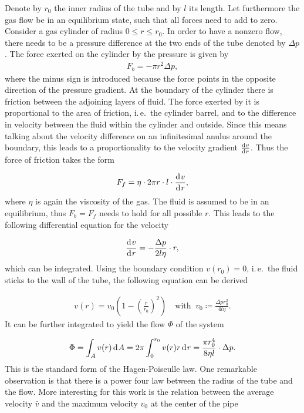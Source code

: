Denote by $r_0$ the inner radius of the tube and by $l$ its
length. Let furthermore the gas flow be in an equilibrium state, such
that all forces need to add to zero. Consider a gas cylinder of radius
$0 \leq r \leq r_0$. In order to have a nonzero flow, there needs to be a
pressure difference at the two ends of the tube denoted by $\Delta
p$. The force exerted on the cylinder by the pressure is given by
\begin{align*}
  F_b = - \pi r^2 \Delta p,
\end{align*}
where the minus sign is introduced because the force points in the
opposite direction of the pressure gradient. At the boundary of the
cylinder there is friction between the adjoining layers of fluid. The
force exerted by it is proportional to the area of friction, i.\,e.\
the cylinder barrel, and to the difference in velocity between the
fluid within the cylinder and outside. Since this means talking about
the velocity difference on an infinitesimal anulus around the
boundary, this leads to a proportionality to the velocity gradient
$\frac{\d[v]}{\d[r]}$. Thus the force of friction takes the form

\begin{align*}
  F_f = \eta \cdot 2\pi r \cdot l \cdot \frac{\d[v]}{\d[r]},
\end{align*}
where $\eta$ is again the viscosity of the gas. The fluid is assumed
to be in an equilibrium, thus $F_b = F_f$ needs to hold for all
possible $r$. This leads to the following differential equation for
the velocity

\begin{align*}
  \frac{\d[v]}{\d[r]} = - \frac{\Delta p}{2l\eta} \cdot r,
\end{align*}
which can be integrated. Using the boundary condition $v(r_0)
= 0$, i.\,e.\ the fluid sticks to the wall of the tube, the following
equation can be derived

\begin{align}
  v(r) = v_0 \left ( 1 - \left( \frac{r}{r_0} \right)^2 \right) \quad
  \text{with }\ v_0 \coloneqq \frac{\Delta p r_0^2}{4 l \eta}. \label{eq:v}
\end{align}
It can be further integrated to yield the flow $\Phi$ of the system

\begin{align*}
  \Phi = \int_A v(r) \d[A] = 2\pi \int_0^{r_0} v(r)r \d[r] = \frac{\pi
  r_0^4}{8\eta l} \cdot \Delta p.
\end{align*}
This is the standard form of the Hagen-Poiseulle law. One remarkable
observation is that there is a power four law between the radius of
the tube and the flow. More interesting for this work is the relation
between the average velocity $\bar v$ and the maximum velocity $v_0$
at the center of the pipe

